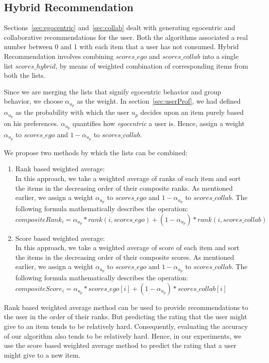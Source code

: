 \documentclass{acm_proc_article-sp}
\begin{document}
\subsection{Hybrid Recommendation}
\label{sec:hybrid}
Sections~\ref{sec:egocentric} and~\ref{sec:collab} dealt with generating egocentric and collaborative recommendations for the user. Both the algorithms associated a real number between 0 and 1 with each item that a user has not consumed. Hybrid Recommendation involves combining $scores\_ego$ and $scores\_collab$ into a single list $scores\_hybrid$, by means of weighted combination of corresponding items from both the lists.

Since we are merging the lists that signify egocentric behavior and group behavior, we choose $\alpha_{u_p}$ as the weight. In section~\ref{sec:userProf}, we had defined $\alpha_{u_p}$ as the probability with which the user $u_p$ decides upon an item purely based on his preferences. $\alpha_{u_p}$ quantifies how \emph{egocentric} a user is. Hence, assign a weight $\alpha_{u_p}$ to $scores\_ego$ and $1 - \alpha_{u_p}$ to $scores\_collab$.

We propose two methods by which the lists can be combined:
\begin{enumerate}
 \item Rank based weighted average:\\
 In this approach, we take a weighted average of ranks of each item and sort the items in the decreasing order of their composite ranks. As mentioned earlier, we assign a weight $\alpha_{u_p}$ to $scores\_ego$ and $1 - \alpha_{u_p}$ to $scores\_collab$. The following formula mathematically describes the operation:\\
 $compositeRank_i = \alpha_{u_p}*rank(i, scores\_ego) + (1 - \alpha_{u_p})*rank(i, scores\_collab)$
 
 \item Score based weighted average:\\
 In this approach, we take a weighted average of score of each item and sort the items in the decreasing order of their composite scores. As mentioned earlier, we assign a weight $\alpha_{u_p}$ to $scores\_ego$ and $1 - \alpha_{u_p}$ to $scores\_collab$. The following formula mathematically describes the operation:\\
 $compositeScore_i = \alpha_{u_p}*scores\_ego[i] + (1 - \alpha_{u_p})*scores\_collab[i]$
\end{enumerate}

Rank based weighted average method can be used to provide recommendations to the user in the order of their ranks. But predicting the rating that the user might give to an item tends to be relatively hard. Consequently, evaluating the accuracy of our algorithm also tends to be relatively hard. Hence, in our experiments, we use the score based weighted average method to predict the rating that a user might give to a new item.
\end{document}

